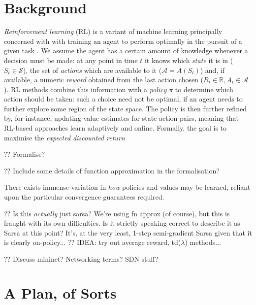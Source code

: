 \documentclass[conference, letterpaper, 10pt, times]{IEEEtran}
\begin{document}
\section{Background}

\emph{Reinforcement learning} (RL) is a variant of machine learning principally concerned with with training an agent to perform optimally in the pursuit of a given task \cite{RL2E}.
We assume the agent has a certain amount of knowledge whenever a decision must be made: at any point in time $t$ it knows which \emph{state} it is in ($S_t \in \mathcal{S}$), the set of \emph{actions} which are available to it ($\mathcal{A} = A(S_t)$) and, if available, a numeric \emph{reward} obtained from the last action chosen ($R_t \in \mathbb{R}, A_t \in \mathcal{A}$).
RL methods combine this information with a \emph{policy} $\pi$ to determine which action should be taken: such a choice need not be optimal, if an agent needs to further explore some region of the state space.
The policy is then further refined by, for instance, updating value estimates for state-action pairs, meaning that RL-based approaches learn adaptively and online.
Formally, the goal is to maximise the \emph{expected discounted return}

?? Formalise?

?? Include some details of function approximation in the formalisation?

There exists immense variation in \emph{how} policies and values may be learned, reliant upon the particular convergence guarantees required.

?? Is this \emph{actually} just sarsa? We're using fn approx (of course), but this is fraught with its own difficulties. Is it strictly speaking correct to describe it as Sarsa at this point? It's, at the very least, 1-step semi-gradient Sarsa given that it is clearly on-policy...
?? IDEA: try out average reward, td($\lambda$) methods...

?? Discuss mininet? Networking terms? SDN stuff?

\section{A Plan, of Sorts}
\end{document}
